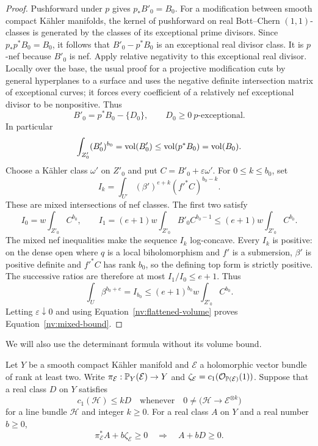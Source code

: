 \begin{proof}
Pushforward under \(p\) gives \(p_*B'_0=B_0\).  For a modification between
smooth compact Kähler manifolds,
the kernel of pushforward on real Bott--Chern \((1,1)\)-classes is generated
by the classes of its exceptional prime divisors.  Since
\(p_*p^*B_0=B_0\), it follows that \(B'_0-p^*B_0\) is an exceptional real
divisor class.  It is
\(p\)-nef because \(B'_0\) is nef.  Apply relative negativity to this
exceptional real divisor.  Locally over the base, the usual proof for a
projective modification cuts by general hyperplanes to a surface and
uses the negative definite intersection matrix of exceptional curves;
it forces every coefficient of a relatively nef exceptional divisor to
be nonpositive.  Thus
\[
 B'_0=p^*B_0-\{D_0\},\qquad D_0\ge0\ \text{\(p\)-exceptional}.
\]
In particular
\begin{equation}\label{nv:flattened-volume}
 \int_{Z'_0}(B'_0)^{b_0}
  =\operatorname{vol}(B'_0)\le\operatorname{vol}(p^*B_0)=\operatorname{vol}(B_0).
\end{equation}
Choose a Kähler class \(\omega'\) on \(Z'_0\) and put
\(C=B'_0+\varepsilon\omega'\).  For \(0\le k\le b_0\), set
\[
 I_k=\int_{U'}(\beta')^{e+k}(f'^*C)^{b_0-k}.
\]
These are mixed intersections of nef classes.  The first two satisfy
\[
 I_0=w\int_{Z'_0}C^{b_0},\qquad
 I_1=(e+1)w\int_{Z'_0}B'_0C^{b_0-1}
       \le(e+1)w\int_{Z'_0}C^{b_0}.
\]
The mixed nef inequalities make the sequence \(I_k\) log-concave.
Every \(I_k\) is positive: on the dense open where \(q\) is a local
biholomorphism and \(f'\) is a submersion, \(\beta'\) is positive
definite and \(f'^*C\) has rank \(b_0\), so the defining top form
is strictly positive.  The successive ratios are therefore at most
\(I_1/I_0\le e+1\).  Thus
\[
 \int_U\beta^{b_0+e}=I_{b_0}
   \le(e+1)^{b_0}w\int_{Z'_0}C^{b_0}.
\]
Letting \(\varepsilon\downarrow0\) and using
Equation~\eqref{nv:flattened-volume} proves Equation~\eqref{nv:mixed-bound}.
\end{proof}

We will also use the determinant formula without its volume bound.

\begin{corollary}\label{nv:slope-descent}
Let \(Y\) be a smooth compact Kähler manifold and \(\mathscr E\) a
holomorphic vector bundle of rank at least two.  Write
\(\pi_{\mathcal{E}}:\mathbb P_Y(\mathcal{E})\to Y\) and
\(\zeta_{\mathcal{E}}=c_1(\mathcal O_{\mathbb P(\mathcal{E})}(1))\).
Suppose that a real class \(D\) on \(Y\) satisfies
\[
 c_1(\mathscr H)\le kD
 \quad\text{whenever}\quad
 0\ne\bigl(\mathscr H\longrightarrow\mathscr E^{\otimes k}\bigr)
\]
for a line bundle \(\mathscr H\) and integer \(k\ge0\).
For a real class \(A\) on \(Y\) and a real number \(b\ge0\),
\begin{equation}\label{nv:slope-descent-equation}
 \pi_{\mathscr E}^*A+b\zeta_{\mathscr E}\ge0
 \quad\Longrightarrow\quad A+bD\ge0 .
\end{equation}
\end{corollary}

